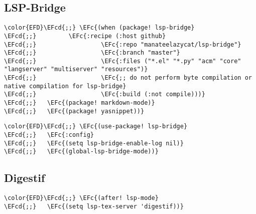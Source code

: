 \documentclass[12pt]{article}
\theoremstyle{plain}%
\theoremstyle{definition}
\theoremstyle{remark}
\newcommand{\EFc}[1]{\textcolor{EFc}{#1}} %
\newcommand{\EFcd}[1]{\textcolor{EFcd}{#1}} %
\begin{document}
\subsection{LSP-Bridge}
\label{sec:org2f3510b}
\begin{Code}
\begin{Verbatim}
\color{EFD}\EFcd{;;} \EFc{(when (package! lsp-bridge}
\EFcd{;;}         \EFc{:recipe (:host github}
\EFcd{;;}                  \EFc{:repo "manateelazycat/lsp-bridge"}
\EFcd{;;}                  \EFc{:branch "master"}
\EFcd{;;}                  \EFc{:files ("*.el" "*.py" "acm" "core" "langserver" "multiserver" "resources")}
\EFcd{;;}                  \EFc{;; do not perform byte compilation or native compilation for lsp-bridge}
\EFcd{;;}                  \EFc{:build (:not compile)))}
\EFcd{;;}   \EFc{(package! markdown-mode)}
\EFcd{;;}   \EFc{(package! yasnippet))}
\end{Verbatim}
\end{Code}
\begin{Code}
\begin{Verbatim}
\color{EFD}\EFcd{;;} \EFc{(use-package! lsp-bridge}
\EFcd{;;}   \EFc{:config}
\EFcd{;;}   \EFc{(setq lsp-bridge-enable-log nil)}
\EFcd{;;}   \EFc{(global-lsp-bridge-mode))}
\end{Verbatim}
\end{Code}
\subsection{Digestif}
\label{sec:org837487d}
\begin{Code}
\begin{Verbatim}
\color{EFD}\EFcd{;;} \EFc{(after! lsp-mode}
\EFcd{;;}   \EFc{(setq lsp-tex-server 'digestif))}
\end{Verbatim}
\end{Code}
\end{document}
